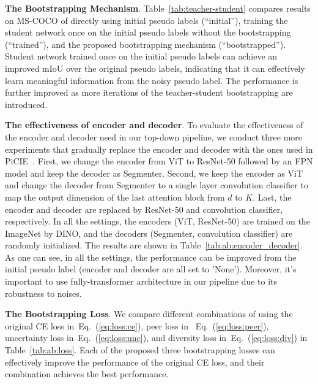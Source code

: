\documentclass[runningheads]{llncs}
\newcommand{\PAR}[1]{\smallskip \noindent \textbf{#1}}
\newcommand{\tabref}[1]{Table~\ref{#1}}
\renewcommand{\eqref}[1]{Eq.~(\ref{#1})}
\begin{document}
\PAR{The Bootstrapping Mechanism}. \tabref{tab:teacher-student} compares results on MS-COCO of directly using initial pseudo labels (``initial''), training the student network once on the initial pseudo labels without the bootstrapping (``trained''), and the proposed bootstrapping mechanism (``bootstrapped''). Student network trained once on the initial pseudo labels can achieve an improved mIoU over the original pseudo labels, indicating that it can effectively learn meaningful information from the noisy pseudo label. The performance is further improved as more iterations of the teacher-student bootstrapping are introduced.


\PAR{The effectiveness of encoder and decoder}. To evaluate the effectiveness of the encoder and decoder used in our top-down pipeline, we conduct three more experiments that gradually replace the encoder and decoder with the ones used in PiCIE~\cite{PiCIE}. First, we change the encoder from ViT to ResNet-50 followed by an FPN model and keep the decoder as Segmenter. Second, we keep the encoder as ViT and change the decoder from Segmenter to a single layer convolution classifier to map the output dimension of the last attention block from $d$ to $K$. Last, the encoder and decoder are replaced by ResNet-50 and convolution classifier, respectively. In all the settings, the encoders (ViT, ResNet-50) are trained on the ImageNet by DINO, and the decoders (Segmenter, convolution classifier) are randomly initialized. The results are shown in \tabref{tab:ab:encoder_decoder}. As one can see, in all the settings, the performance can be improved from the initial pseudo label (encoder and decoder are all set to 'None'). Moreover, it's important to use fully-transformer architecture in our pipeline due to its robustness to noises.





\PAR{The Bootstrapping Loss}. We compare different combinations of using the original CE loss in~\eqref{eq:loss:ce}, peer loss in ~\eqref{eq:loss:peer}, uncertainty loss in~\eqref{eq:loss:unc}, and diversity loss in~\eqref{eq:loss:div} in \tabref{tab:ab:loss}. Each of the proposed three bootstrapping losses can effectively improve the performance of the original CE loss, and their combination achieves the best performance. 
\end{document}
